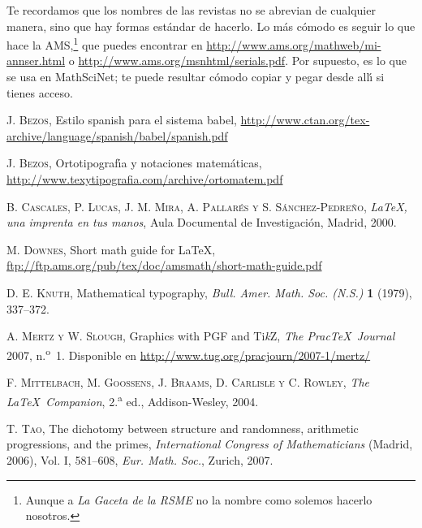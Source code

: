 \documentclass[autocontact]{gaceta}
\begin{document}
Te recordamos que los nombres de las revistas no se abrevian de cualquier manera, sino que hay formas est\'andar de hacerlo. Lo m\'as c\'omodo es seguir lo que hace la AMS,\footnote{Aunque a \textit{La Gaceta de la RSME} no la nombre como solemos hacerlo nosotros.} que puedes encontrar en \url{http://www.ams.org/mathweb/mi-annser.html}
o \url{http://www.ams.org/msnhtml/serials.pdf}. Por supuesto, es lo que se usa en MathSciNet; te puede resultar c\'omodo copiar y pegar desde all\'{\i} si tienes acceso.

\begin{thebibliography}{9}

\textsc{J. Bezos}, 
Estilo spanish para el sistema babel,
\url{http://www.ctan.org/tex-archive/language/spanish/babel/spanish.pdf}

\textsc{J. Bezos}, 
Ortotipograf\'{\i}a y notaciones matem\'aticas,
\url{http://www.texytipografia.com/archive/ortomatem.pdf}

\textsc{B. Cascales, P. Lucas, J. M. Mira, A. Pallar\'es y S. S\'anchez-Pedre\~no}, 
\textit{LaTeX, una imprenta en tus manos}, 
Aula Documental de Investigaci\'on, Madrid, 2000.

\textsc{M. Downes},
Short math guide for \LaTeX,
\url{ftp://ftp.ams.org/pub/tex/doc/amsmath/short-math-guide.pdf}

\textsc{D. E. Knuth}, 
Mathematical typography, 
\textit{Bull. Amer. Math. Soc. (N.S.)} 
\textbf{1} (1979), 337--372. 

\textsc{A. Mertz y W. Slough},
Graphics with PGF and Ti\textit{k}Z,
\textit{The Prac\TeX\ Journal} 2007, n.\textsuperscript{o}~1.
Disponible en
\url{http://www.tug.org/pracjourn/2007-1/mertz/}

\textsc{F. Mittelbach, M. Goossens, J. Braams, D. Carlisle y C. Rowley}, 
\textit{The \LaTeX\ Companion}, 
2.\textsuperscript{a} ed., 
Addison-Wesley, 2004. 

\textsc{T. Tao}, 
The dichotomy between structure and randomness, arithmetic progressions, and the primes, 
\textit{International Congress of Mathematicians} (Madrid, 2006), 
Vol. I, 581--608, \textit{Eur. Math. Soc.}, Zurich, 2007.

\end{thebibliography}

\end{document}
